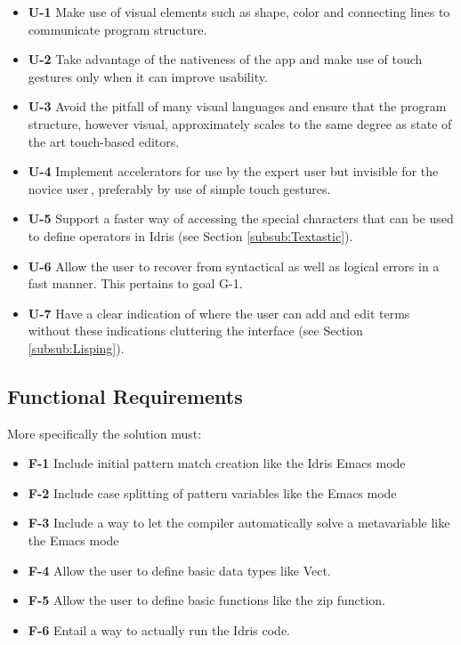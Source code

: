 \begin{itemize}     
	\item \textbf{U-1} Make use of visual elements such as shape, color and connecting lines to 
	communicate program structure.
	\item \textbf{U-2} Take advantage of the nativeness of the app and make use of touch gestures only
	when it can improve usability.
	\item \textbf{U-3} Avoid the pitfall of many visual languages\cite{green1992visual} and ensure 
	that the program structure, however visual, approximately scales to the same degree as state of 
	the art touch-based editors.
	\item \textbf{U-4} Implement accelerators for use by the expert user but invisible for the novice
	user\,\cite{nielsen1990heuristic}, preferably by use of simple touch gestures.
	\item \textbf{U-5} Support a faster way of accessing the special characters that can be used 
	to define operators in Idris (see Section \ref{subsub:Textastic}).
	\item \textbf{U-6} Allow the user to recover from syntactical as well as logical errors in a fast
	manner. This pertains to goal G-1.
	\item \textbf{U-7} Have a clear indication of where the user can add and edit terms without these
	indications cluttering the interface (see Section \ref{subsub:Lisping}).
\end{itemize}


\subsection{Functional Requirements} 
\label{subsec:FunctionalRequirements} 
More specifically the solution must:

\begin{itemize}
	\item \textbf{F-1} Include initial pattern match creation like the Idris Emacs mode \cite{Idris:EmacsMode}
	\item \textbf{F-2} Include case splitting of pattern variables like the Emacs mode \cite{Idris:EmacsMode}
	\item \textbf{F-3} Include a way to let the compiler automatically solve a metavariable like the
	Emacs mode \cite{Idris:EmacsMode}
	\item \textbf{F-4} Allow the user to define basic data types like Vect.
	\item \textbf{F-5} Allow the user to define basic functions like the zip function.
	\item \textbf{F-6} Entail a way to actually run the Idris code.
\end{itemize}

